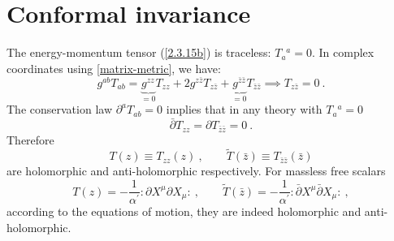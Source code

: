 \section{\texorpdfstring{Conformal invariance}{2.4 Conformal invariance}}

The energy-momentum tensor (\ref{2.3.15b}) is traceless: $T_a{}^a=0$.    
In complex coordinates using \eqref{matrix-metric}, we have: 
\begin{equation}
	g^{ab}T_{ab}=\underbrace{g^{zz}}_{=0}T_{zz}+2g^{z\bar{z}}T_{z\bar{z}}+\underbrace{g^{\bar{z}\bar{z}}}_{=0}T_{\bar{z}\bar{z}}\implies T_{z \bar{z}}=0\:. \label{2.4.1}
\end{equation}
The conservation law $\partial^a T_{ab}=0$ implies that in any theory with $T_a{}^a=0$    
\begin{equation}
	\bar{\partial} T_{z z}=\partial T_{\bar{z} \bar{z}}=0 \:. \label{2.4.2}
\end{equation}
Therefore    
\begin{equation}
	T(z) \equiv T_{z z}(z)\:, \qquad \tilde{T}(\bar{z}) \equiv T_{\bar{z} \bar{z}}(\bar{z}) \label{2.4.3}
\end{equation}
are holomorphic and anti-holomorphic respectively.    
For massless free scalars    
\begin{equation}\label{2.4.4}
	T(z)=-\frac{1}{\alpha^{\prime}}: \mathrel{\partial X^{\mu} \partial X_{\mu}}: \:, \qquad 
	\tilde{T}(\bar{z})=-\frac{1}{\alpha^{\prime}}:\mathrel{ \bar{\partial} X^{\mu} \bar{\partial} X_{\mu}}: \:,
\end{equation}
according to the equations of motion, they are indeed holomorphic and anti-holomorphic.    


